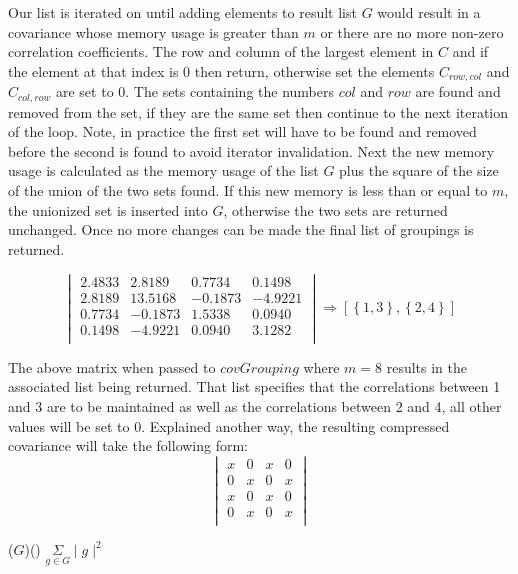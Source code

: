 \documentclass[11pt]{article}
\begin{document}
Our list is iterated on until adding elements to result list $G$ would result in a covariance whose memory usage is greater than $m$ or there are no more non-zero correlation coefficients.
The row and column of the largest element in $C$ and if the element at that index is $0$ then return, otherwise set the elements $C_{row,col}$ and $C_{col,row}$ are set to $0$.  
The sets containing the numbers $col$ and $row$ are found and removed from the set, if they are the same set then continue to the next iteration of the loop. 
Note, in practice the first set will have to be found and removed before the second is found to avoid iterator invalidation. 
Next the new memory usage is calculated as the memory usage of the list $G$ plus the square of the size of the union of the two sets found. 
If this new memory is less than or equal to $m$, the unionized set is inserted into $G$, otherwise the two sets are returned unchanged. 
Once no more changes can be made the final list of groupings is returned. 

\begin{figure}[h]
$$
\begin{vmatrix}
	2.4833 & 2.8189  &  0.7734  &  0.1498 \\
    2.8189 & 13.5168 & -0.1873  & -4.9221 \\
    0.7734 & -0.1873 &  1.5338  &  0.0940 \\
    0.1498 & -4.9221 &  0.0940  &  3.1282 \\
\end{vmatrix}
\Rightarrow 
\left[\left\{1,3\right\},\left\{2,4\right\}\right]
$$
\end{figure}

The above matrix when passed to $covGrouping$ where $m = 8$ results in the associated list being returned. 
That list specifies that the correlations between 1 and 3 are to be maintained as well as the correlations between 2 and 4, all other values will be set to $0$. 
Explained another way, the resulting compressed covariance will take the following form:
$$
\begin{vmatrix}
	x & 0 & x & 0 \\
	0 & x & 0 & x \\
	x & 0 & x & 0 \\
	0 & x & 0 & x \\
\end{vmatrix}
$$

\begin{algorithm}

\memoryUsage($G$)\Begin() {
	\Return $\underset{g \in G}{\Sigma}\mid g \mid^2$
}
	
\end{algorithm}
\end{document}
